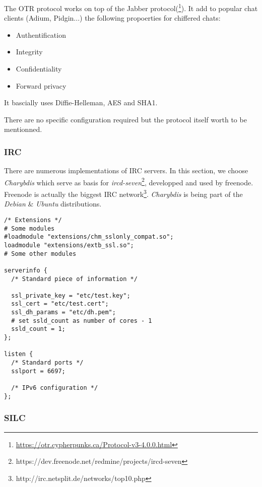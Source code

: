 The OTR protocol works on top of the Jabber protocol(\footnote{\url{https://otr.cypherpunks.ca/Protocol-v3-4.0.0.html}}).  
It add to popular chat clients (Adium, Pidgin...) the following propoerties for chiffered chats:
\begin{itemize}
    \item Authentification
    \item Integrity
    \item Confidentiality
    \item Forward privacy
\end{itemize}

It bascially uses Diffie-Helleman, AES and SHA1. 

There are no specific configuration required but the protocol itself worth to be mentionned.

\subsubsection{IRC}


There are numerous implementations of IRC servers.  In this section, we choose {\it Charybdis} which serve as basis for {\it ircd-seven}\footnote{https://dev.freenode.net/redmine/projects/ircd-seven}, developped and used by freenode. Freenode is actually the biggest IRC network\footnote{http://irc.netsplit.de/networks/top10.php}.  {\it Charybdis} is being part of the {\it Debian} \& {\it Ubuntu} distributions.

\begin{lstlisting}[breaklines]
/* Extensions */
# Some modules 
#loadmodule "extensions/chm_sslonly_compat.so";
loadmodule "extensions/extb_ssl.so";
# Some other modules

serverinfo {
  /* Standard piece of information */
  
  ssl_private_key = "etc/test.key";
  ssl_cert = "etc/test.cert";
  ssl_dh_params = "etc/dh.pem";
  # set ssld_count as number of cores - 1
  ssld_count = 1; 
};

listen {
  /* Standard ports */
  sslport = 6697;

  /* IPv6 configuration */
};
\end{lstlisting}


\subsubsection{SILC}




